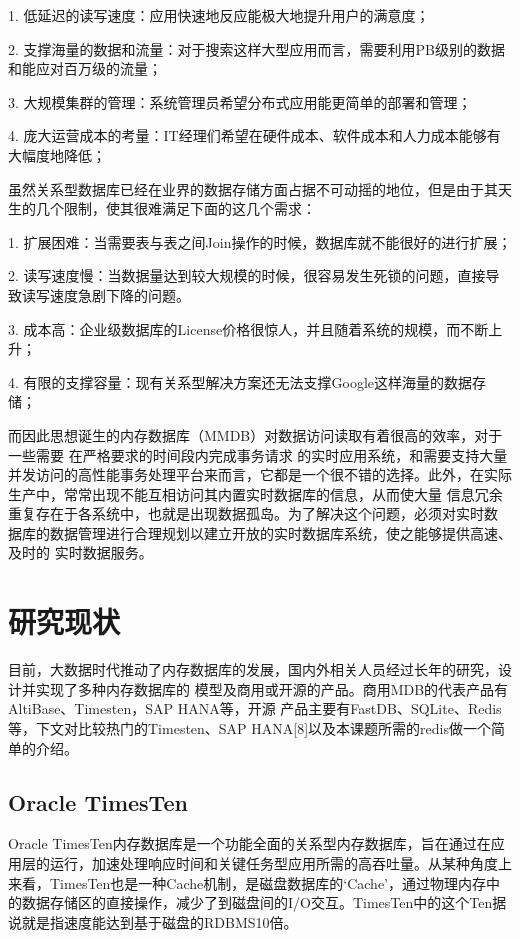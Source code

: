 \documentclass[proposal]{zjutreport}
\begin{document}
1. 低延迟的读写速度：应用快速地反应能极大地提升用户的满意度；

2. 支撑海量的数据和流量：对于搜索这样大型应用而言，需要利用PB级别的数据和能应对百万级的流量；

3. 大规模集群的管理：系统管理员希望分布式应用能更简单的部署和管理；

4. 庞大运营成本的考量：IT经理们希望在硬件成本、软件成本和人力成本能够有大幅度地降低；

虽然关系型数据库已经在业界的数据存储方面占据不可动摇的地位，但是由于其天生的几个限制，使其很难满足下面的这几个需求：

1. 扩展困难：当需要表与表之间Join操作的时候，数据库就不能很好的进行扩展；

2. 读写速度慢：当数据量达到较大规模的时候，很容易发生死锁的问题，直接导致读写速度急剧下降的问题。

3. 成本高：企业级数据库的License价格很惊人，并且随着系统的规模，而不断上升；

4. 有限的支撑容量：现有关系型解决方案还无法支撑Google这样海量的数据存储；

而因此思想诞生的内存数据库（MMDB）对数据访问读取有着很高的效率，对于一些需要
在严格要求的时间段内完成事务请求
的实时应用系统，和需要支持大量并发访问的高性能事务处理平台来而言，它都是一个很不错的选择。此外，在实际生产中，常常出现不能互相访问其内置实时数据库的信息，从而使大量
信息冗余重复存在于各系统中，也就是出现数据孤岛。为了解决这个问题，必须对实时数
据库的数据管理进行合理规划以建立开放的实时数据库系统，使之能够提供高速、及时的
实时数据服务。

\section{研究现状}
目前，大数据时代推动了内存数据库的发展，国内外相关人员经过长年的研究，设计并实现了多种内存数据库的
模型及商用或开源的产品。商用MDB的代表产品有AltiBase、Timesten，SAP HANA等，开源
产品主要有FastDB、SQLite、Redis等，下文对比较热门的Timesten、SAP HANA[8]以及本课题所需的redis做一个简单的介绍。

\subsection{Oracle TimesTen}
Oracle TimesTen内存数据库是一个功能全面的关系型内存数据库，旨在通过在应用层的运行，加速处理响应时间和关键任务型应用所需的高吞吐量。从某种角度上来看，TimesTen也是一种Cache机制，是磁盘数据库的‘Cache’，通过物理内存中的数据存储区的直接操作，减少了到磁盘间的I/O交互。TimesTen中的这个Ten据说就是指速度能达到基于磁盘的RDBMS10倍。
\end{document}
